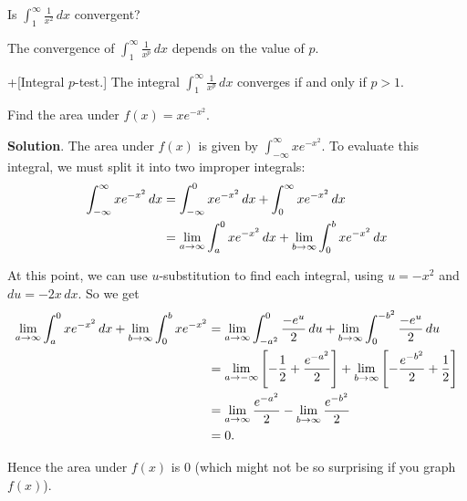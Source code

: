 \documentclass[10pt,]{book}
\theoremstyle{ptxplainnotitle}
\theoremstyle{ptxplaintitle}
\theoremstyle{ptxplainnotitle}
\theoremstyle{ptxplaintitle}
\theoremstyle{ptxplainnotitle}
\theoremstyle{ptxplaintitle}
\theoremstyle{ptxdefinitionnotitle}
\theoremstyle{ptxdefinitiontitle}
\theoremstyle{ptxdefinitionnotitle}
\theoremstyle{ptxdefinitiontitle}
\theoremstyle{ptxdefinitionnotitle}
\theoremstyle{ptxdefinitiontitle}
\theoremstyle{ptxdefinitionnotitle}
\theoremstyle{ptxdefinitiontitle}
\theoremstyle{ptxdefinitionnotitle}
\theoremstyle{ptxdefinitiontitle}
\numberwithin{equation}{section}
\newcommand{\gt}{>}
\begin{document}
\begin{example}\label{example-convergent-improper-integral}
\hypertarget{p-585}{}%
Is \(\int_{1}^{\infty}\frac{1}{x^{2}}\,dx\) convergent?%
\end{example}
\hypertarget{p-586}{}%
The convergence of \(\int_{1}^{\infty}\frac{1}{x^{p}}\,dx\) depends on the value of \(p\).%
\begin{theorem}+[{Integral \(p\)-test.}]\label{theorem-integral-p-test}
\hypertarget{p-587}{}%
The integral \(\int_{1}^{\infty}\frac{1}{x^{p}}\,dx\) converges if and only if \(p \gt 1\).%
\end{theorem}
\begin{example}\label{example-area-under-a-graph}
\hypertarget{p-588}{}%
Find the area under \(f(x) = xe^{-x^{2}}\).%
\par\smallskip%
\noindent\textbf{Solution}.\hypertarget{solution-127}{}\quad%
\hypertarget{p-589}{}%
The area under \(f(x)\) is given by \(\int_{-\infty}^{\infty}xe^{-x^{2}}\). To evaluate this integral, we must split it into two improper integrals:%
\begin{align*}
\int_{-\infty}^{\infty}xe^{-x^{2}}\,dx & = \int_{-\infty}^{0}xe^{-x^{2}}\,dx + \int_{0}^{\infty}xe^{-x^{2}}\,dx \\
& = \lim_{a\to\-\infty}\int_{a}^{0}xe^{-x^{2}}\,dx + \lim_{b\to\infty}\int_{0}^{b}xe^{-x^{2}}\,dx 
\end{align*}
%
\par
\hypertarget{p-590}{}%
At this point, we can use \(u\)-substitution to find each integral, using \(u = -x^{2}\) and \(du = -2x\,dx\). So we get%
\begin{align*}
\lim_{a\to\-\infty}\int_{a}^{0}xe^{-x^{2}}\,dx + \lim_{b\to\infty}\int_{0}^{b}xe^{-x^{2}} & = \lim_{a\to\-\infty}\int_{-a^{2}}^{0}\frac{-e^{u}}{2}\,du + \lim_{b\to\infty}\int_{0}^{-b^{2}}\frac{-e^{u}}{2}\,du \\
& = \lim_{a\to-\infty}\left[-\frac{1}{2} + \frac{e^{-a^{2}}}{2}\right] + \lim_{b\to\infty}\left[-\frac{e^{-b^{2}}}{2} + \frac{1}{2}\right]\\
& = \lim_{a\to\infty}\frac{e^{-a^{2}}}{2} - \lim_{b\to\infty}\frac{e^{-b^{2}}}{2} \\
& = 0. 
\end{align*}
%
\par
\hypertarget{p-591}{}%
Hence the area under \(f(x)\) is \(0\) (which might not be so surprising if you graph \(f(x)\)).%
\end{example}
\end{document}
